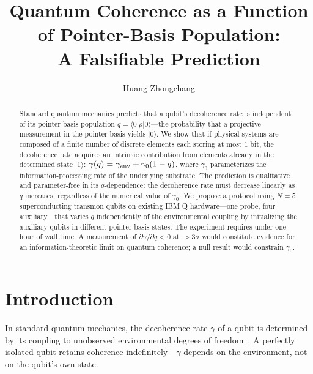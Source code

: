 \documentclass[aps,prl,twocolumn,superscriptaddress,hyperref]{revtex4-2}
\begin{document}
\title{Quantum Coherence as a Function of Pointer-Basis Population:\\
A Falsifiable Prediction}

\author{Huang Zhongchang}

\begin{abstract}
Standard quantum mechanics predicts that a qubit's decoherence rate is independent of its pointer-basis population $q = \langle 0|\rho|0\rangle$---the probability that a projective measurement in the pointer basis yields $|0\rangle$. We show that if physical systems are composed of a finite number of discrete elements each storing at most 1 bit, the decoherence rate acquires an intrinsic contribution from elements already in the determined state $|1\rangle$: $\gamma(q) = \gamma_{\rm env} + \gamma_0(1-q)$, where $\gamma_0$ parameterizes the information-processing rate of the underlying substrate. The prediction is qualitative and parameter-free in its $q$-dependence: the decoherence rate must decrease linearly as $q$ increases, regardless of the numerical value of $\gamma_0$. We propose a protocol using $N=5$ superconducting transmon qubits on existing IBM Q hardware---one probe, four auxiliary---that varies $q$ independently of the environmental coupling by initializing the auxiliary qubits in different pointer-basis states. The experiment requires under one hour of wall time. A measurement of $\partial\gamma/\partial q < 0$ at $>3\sigma$ would constitute evidence for an information-theoretic limit on quantum coherence; a null result would constrain $\gamma_0$.
\end{abstract}

\maketitle

\section{Introduction}

In standard quantum mechanics, the decoherence rate $\gamma$ of a qubit is determined by its coupling to unobserved environmental degrees of freedom~\cite{Zurek:2003,Schlosshauer:2007}. A perfectly isolated qubit retains coherence indefinitely---$\gamma$ depends on the environment, not on the qubit's own state.
\end{document}
